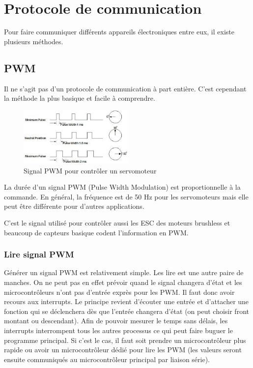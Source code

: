 \documentclass[a4paper, 11pt]{report}
\begin{document}
\chapter{Protocole de communication}

Pour faire communiquer différents appareils électroniques entre eux, il existe plusieurs méthodes.

\section{PWM}
Il ne s'agit pas d'un protocole de communication à part entière. C'est cependant la méthode la plus basique et facile à comprendre.


\begin{figure}[h!]
\begin{centering}
\includegraphics[width=0.5\textwidth]{images/PWMservo.jpeg}
\caption{Signal PWM pour contrôler un servomoteur}
\par\end{centering}
\end{figure}

La durée d'un signal PWM (Pulse Width Modulation) est proportionnelle à la commande. En général, la fréquence est de 50 Hz pour les servomoteurs mais elle peut être différente pour d'autres applications.

C'est le signal utilisé pour contrôler aussi les ESC des moteurs brushless et beaucoup de capteurs basique codent l'information en PWM.

\subsection{Lire signal PWM}
Générer un signal PWM est relativement simple. Les lire est une autre paire de manches. On ne peut pas en effet prévoir quand le signal changera d'état et les microcontrôleurs n'ont pas d'entrée exprès pour les PWM. Il faut donc avoir recours aux interrupts. Le principe revient d'écouter une entrée et d'attacher une fonction qui se déclenchera dès que l'entrée changera d'état (on peut choisir front montant ou descendant). Afin de pouvoir mesurer le temps sans délais, les interrupts interrompent tous les autres processus ce qui peut faire buguer le programme principal. Si c'est le cas, il faut soit prendre un microcontrôleur plus rapide ou avoir un microcontrôleur dédié pour lire les PWM (les valeurs seront ensuite communiqués au microcontrôleur principal par liaison série).
\end{document}
